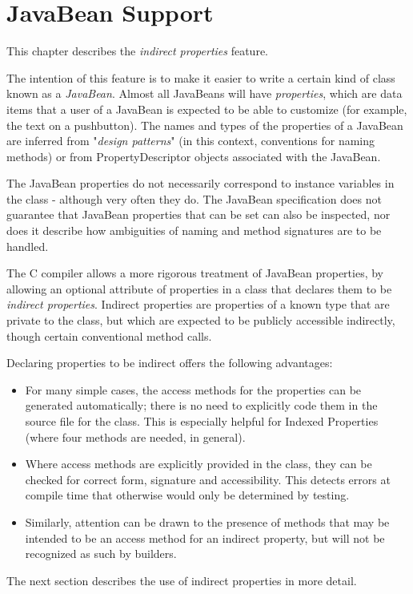 \chapter{JavaBean Support}\label{refappb}
 
This chapter describes the  \emph{indirect
properties} feature.
 
The intention of this feature is to make it easier to write a certain
kind of class known as a \emph{JavaBean}.
Almost all JavaBeans will have \emph{properties}, which are data items
that a user of a JavaBean is expected to be able to customize (for
example, the text on a pushbutton).  The names and types of the
properties of a JavaBean are inferred from "\emph{design
patterns}" (in this context, conventions for naming methods) or
from PropertyDescriptor objects associated with the JavaBean.
 
The JavaBean properties do not necessarily correspond to instance
variables in the class - although very often they do.  The
JavaBean specification does not guarantee that JavaBean properties
that can be set can also be inspected, nor does it describe how
ambiguities of naming and method signatures are to be handled.
 
The \nr{}C compiler
allows a more rigorous
treatment of JavaBean properties, by allowing an optional attribute of
properties in a class that declares them to be \emph{indirect
properties}.  Indirect properties are properties of a known type
that are private to the class, but which are expected to be publicly
accessible indirectly, though certain conventional method calls.
 
Declaring properties to be indirect offers the following advantages:
\begin{itemize}
\item For many simple cases, the access methods for the properties can be
generated automatically; there is no need to explicitly code them in the
source file for the class.  This is especially helpful for Indexed
Properties (where four methods are needed, in general).
\item Where access methods are explicitly provided in the class, they can
be checked for correct form, signature and accessibility.  This detects
errors at compile time that otherwise would only be determined by
testing.
\item Similarly, attention can be drawn to the presence of methods that
may be intended to be an access method for an indirect property, but
will not be recognized as such by builders.
\end{itemize}
 The next section describes the use of indirect properties in more
detail.
